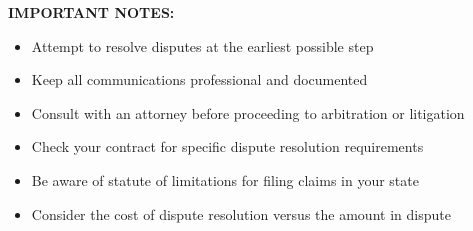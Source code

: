 \documentclass[11pt,letterpaper]{article}
\begin{document}
\vspace{12pt}

\textbf{IMPORTANT NOTES:}

\begin{itemize}[leftmargin=0.5in]
\item Attempt to resolve disputes at the earliest possible step
\item Keep all communications professional and documented
\item Consult with an attorney before proceeding to arbitration or litigation
\item Check your contract for specific dispute resolution requirements
\item Be aware of statute of limitations for filing claims in your state
\item Consider the cost of dispute resolution versus the amount in dispute
\end{itemize}
\end{document}
